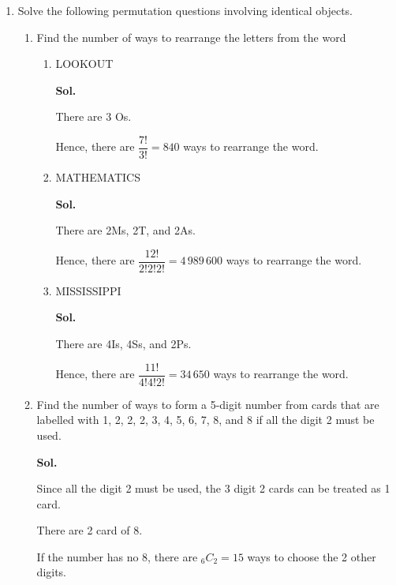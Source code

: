 \documentclass{report}
\newcommand\comb[2][^n]{{}_{#1}C_{#2}}
\newcommand{\sol}[1]{

      \noindent \textbf{Sol.}
}
\def\eos{\quad\hbox{\rlap{\hbox{\vrule depth 1.5pt height 2.6mm width 0.2mm \hskip 1mm \vrule height 2.6mm width 0.2mm}}{\vbox{\hrule height 0.2mm width 1.4mm \vskip 2.8mm \hrule depth 1.5pt height -0.35mm width 1.2mm}}}}
\begin{document}
\begin{multicols*}{2}
\begin{enumerate}
            \item Solve the following permutation questions involving identical objects.
                  \begin{enumerate}
                        \item Find the number of ways to rearrange the letters from the word
                              \begin{enumerate}
                                    \item LOOKOUT \sol{}

                                          There are 3 Os.

                                          Hence, there are $\dfrac{7!}{3!} = 840$ ways to rearrange the word. $\eos$

                                    \item MATHEMATICS \sol{}

                                          There are 2Ms, 2T, and 2As.

                                          Hence, there are $\dfrac{12!}{2!2!2!} = 4\,989\,600$ ways to rearrange the
                                          word. $\eos$

                                    \item MISSISSIPPI \sol{}

                                          There are 4Is, 4Ss, and 2Ps.

                                          Hence, there are $\dfrac{11!}{4!4!2!} = 34\,650$ ways to rearrange the word.
                                          $\eos$
                              \end{enumerate}

                        \item Find the number of ways to form a 5-digit number from cards that are labelled
                              with 1, 2, 2, 2, 3, 4, 5, 6, 7, 8, and 8 if all the digit 2 must be used.
                              \sol{}

                              Since all the digit 2 must be used, the 3 digit 2 cards can be treated as 1
                              card.

                              There are 2 card of 8.

                              If the number has no 8, there are $\comb[6]{2} = 15$ ways to choose the 2 other
                              digits.


\end{enumerate}
\end{enumerate}
\end{multicols*}
\end{document}
